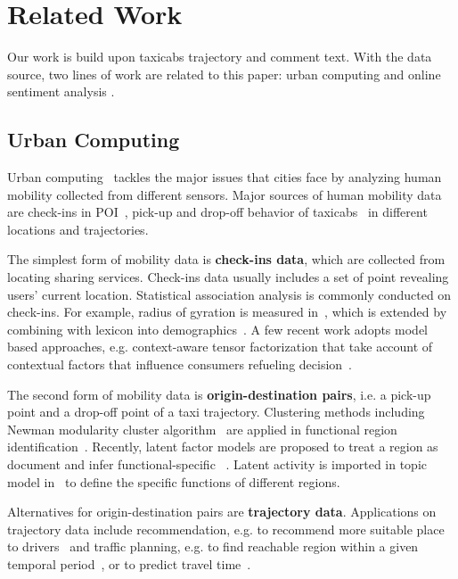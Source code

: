 \documentclass[runningheads]{llncs}
\begin{document}
\section{Related Work}
Our work is build upon taxicabs trajectory and comment text.
With the data source, two lines of work are related to this paper: urban computing and online sentiment analysis .

\subsection{Urban Computing}

Urban computing~\cite{Zheng2014UrbanConcepts} tackles the major issues that cities face by analyzing human mobility collected from different sensors.
Major sources of human mobility data are check-ins in POI~\cite{Gallegos16happier}, pick-up and drop-off behavior of taxicabs~\cite{Ge2011TaxiBusiness,Meng2017Traffic} in different locations and  trajectories.

The simplest form of mobility data is \textbf{check-ins data}, which are collected from locating sharing services. Check-ins data usually includes a set of point revealing users' current location.
Statistical association analysis is commonly conducted on check-ins. For example, radius of gyration is measured in~\cite{Cheng2011Check-in}, which is extended by combining with lexicon into demographics~\cite{Gallegos16happier}.
A few recent work adopts model based approaches, e.g. context-aware tensor factorization that take account of contextual factors that influence consumers refueling decision~\cite{Zhang2015Fuel}.

The second form of mobility data is \textbf{origin-destination pairs}, i.e. a pick-up point and a drop-off point of a taxi trajectory.
Clustering methods including Newman modularity cluster algorithm~\cite{Newman2004ModularityFunction} are applied in functional region identification~\cite{Ratti2010Telecom}.
Recently, latent factor models are proposed to treat a region as document and infer functional-specific ~\cite{Yuan2012FunctionRegion}.%
Latent activity is imported in topic model in~\cite{Yuan2015FunctionRegion} to define the specific functions of different regions.

Alternatives for origin-destination pairs are \textbf{trajectory data}.
Applications on trajectory data include recommendation, e.g. to recommend more suitable place to drivers~\cite{Ge2011TaxiBusiness,Garg2018Route} and traffic planning, e.g. to find reachable region within a given temporal period~\cite{Wu2017Reachable}, %
or to predict travel time~\cite{Wang2018Deep}.
\end{document}
